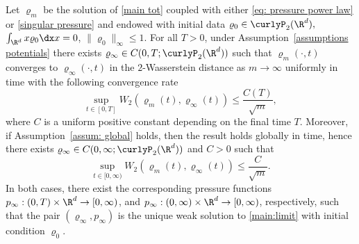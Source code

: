 \begin{theorem}\label{thm: main}
Let $\varrho_m$ be the solution of \eqref{main tot} coupled with either \eqref{eq: pressure power law} or \eqref{singular pressure} and endowed with initial data $\varrho_0\in \curlyP_2(\R^d),$ $\int_{\R^d} x \varrho_0 \dx x=0$, $\|\varrho_0\|_\infty \leq 1$. For all $T>0$, under Assumption~\ref{assumptions potentials} there exists $\varrho_\infty\in C(0,T; \curlyP_2(\R^d))$ such that $\varrho_m(\cdot, t)$ converges to $\varrho_\infty(\cdot, t)$ in the $2$-Wasserstein distance as $m\to\infty$ uniformly in time with the following convergence rate
\begin{equation*}
\sup_{t\in[0,T]} W_2(\varrho_m(t), \varrho_\infty(t)) \leq \frac{C(T)}{\sqrt{m}},
\end{equation*}
where $C$ is a uniform positive constant depending on the final time $T$.
Moreover, if Assumption~\ref{assum: global} holds, then the result holds globally in time, hence
there exists $\varrho_\infty\in C(0,\infty; \curlyP_2(\R^d))$ and $C>0$ such that
\begin{equation*}
\sup_{t\in[0,\infty)} W_2(\varrho_m(t), \varrho_\infty(t)) \leq \frac{C}{\sqrt{m}}.
\end{equation*}
In both cases, there exist the corresponding pressure functions $p_{\infty}:(0,T)\times\R^{d}\to [0,\infty)$, and $p_{\infty}:(0,\infty)\times\R^{d}\to[0,\infty)$, respectively, such that the pair $(\varrho_{\infty},p_{\infty})$ is the unique weak solution to \eqref{main:limit} with initial condition $\varrho_{0}$.

\end{theorem}

